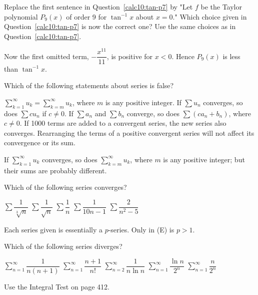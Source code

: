 \question\label{calc10:tan-p9}
Replace the first sentence in Question~\ref{calc10:tan-p7} by "Let $f$ be the Taylor polynomial $P_{9}(x)$ of order 9 for $\tan ^{-1} x$ about $x=0$." Which choice given in Question~\ref{calc10:tan-p7} is now the correct one? Use the same choices as in Question~\ref{calc10:tan-p7}.
\begin{solution}
Now the first omitted term, $-\dfrac{x^{11}}{11}$, is positive for $x<0$. Hence $P_{9}(x)$ is less than $\tan ^{-1} x$.
\end{solution}

\question
Which of the following statements about series is false?
\begin{choices}
  \CorrectChoice $\sum\limits_{k=1}^{\infty} u_{k}=\sum\limits_{k=m}^{\infty} u_{k}$, where $m$ is any positive integer.
  \choice If $\sum u_{n}$ converges, so does $\sum c u_{n}$ if $c \neq 0$.
  \choice If $\sum a_{n}$ and $\sum b_{n}$ converge, so does $\sum\left(c a_{n}+b_{n}\right)$, where $c \neq 0$.
  \choice If 1000 terms are added to a convergent series, the new series also converges.
  \choice Rearranging the terms of a positive convergent series will not affect its convergence or its sum.
\end{choices}
\begin{solution}
If $\sum\limits_{k=1}^{\infty} u_{k}$ converges, so does $\sum\limits_{k=m}^{\infty} u_{k}$, where $m$ is any positive integer; but their sums are probably different.
\end{solution}



\newpage




\question
Which of the following series converges?
\begin{choices}
  \choice $\sum \dfrac{1}{\sqrt[3]{n}}$
  \choice $\sum \dfrac{1}{\sqrt{n}}$
  \choice $\sum \dfrac{1}{n}$
  \choice $\sum \dfrac{1}{10 n-1}$
  \CorrectChoice $\sum \dfrac{2}{n^{2}-5}$
\end{choices}
\begin{solution}
Each series given is essentially a $p$-series. Only in (E) is $p>1$.
\end{solution}

\question
Which of the following series diverges?
\begin{choices}
  \choice $\sum\limits_{n=1}^{\infty} \dfrac{1}{n(n+1)}$
  \choice $\sum\limits_{n=1}^{\infty} \dfrac{n+1}{n!}$
  \CorrectChoice $\sum\limits_{n=2}^{\infty} \dfrac{1}{n \ln n}$
  \choice $\sum\limits_{n=1}^{\infty} \dfrac{\ln n}{2^{n}}$
  \choice $\sum\limits_{n=1}^{\infty} \dfrac{n}{2^{n}}$


\end{choices}
\begin{solution}
Use the Integral Test on page 412.
\end{solution}

